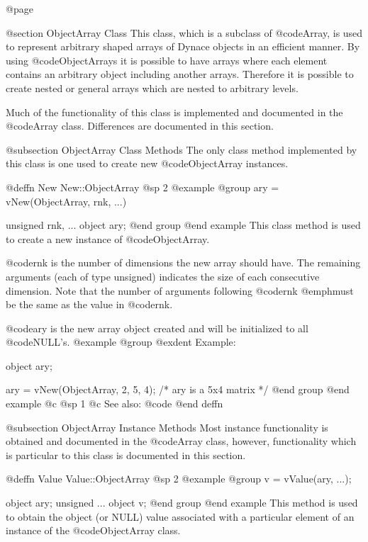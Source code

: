 @page

@section  ObjectArray Class
This class, which is a subclass of @code{Array}, is used to represent
arbitrary shaped arrays of Dynace objects in an efficient manner.  By
using @code{ObjectArray}s it is possible to have arrays where each
element contains an arbitrary object including another arrays.
Therefore it is possible to create nested or general arrays which are
nested to arbitrary levels.


Much of the functionality of this class is implemented and documented in
the @code{Array} class.  Differences are documented in this section.



@subsection ObjectArray Class Methods
The only class method implemented by this class is one used to create
new @code{ObjectArray} instances.






@deffn {New} New::ObjectArray
@sp 2
@example
@group
ary = vNew(ObjectArray, rnk, ...)

unsigned  rnk, ...
object    ary;
@end group
@end example
This class method is used to create a new instance of @code{ObjectArray}.

@code{rnk} is the number of dimensions the new array should have.
The remaining arguments (each of type unsigned) indicates the size of
each consecutive dimension.  Note that the number of arguments following
@code{rnk} @emph{must} be the same as the value in @code{rnk}.

@code{ary} is the new array object created and will be initialized to all
@code{NULL}'s.
@example
@group
@exdent Example:

object  ary;

ary = vNew(ObjectArray, 2, 5, 4);
/*  ary is a 5x4 matrix  */
@end group
@end example
@c @sp 1
@c See also:  @code{}
@end deffn



@subsection ObjectArray Instance Methods
Most instance functionality is obtained and documented in the @code{Array}
class, however, functionality which is particular to this class is documented
in this section.





@deffn {Value} Value::ObjectArray
@sp 2
@example
@group
v = vValue(ary, ...);

object    ary;
unsigned  ...
object    v;
@end group
@end example
This method is used to obtain the object (or NULL) value associated with a
particular element of an instance of the @code{ObjectArray} class.

